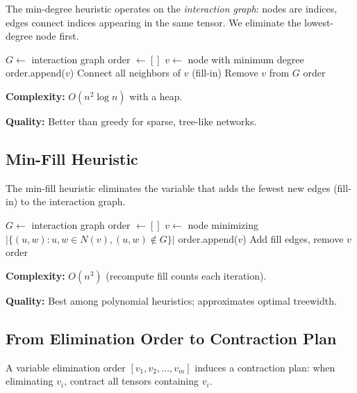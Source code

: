 \documentclass[11pt,a4paper]{article}
\begin{document}
The min-degree heuristic operates on the \emph{interaction graph}: nodes are indices,
edges connect indices appearing in the same tensor. We eliminate the lowest-degree node first.

\begin{algorithm}[ht]
\caption{Min-Degree Variable Elimination}
\label{alg:min_degree_chirho}
\begin{algorithmic}[1]
\State $G \gets$ interaction graph
\State order $\gets []$
  \State $v \gets$ node with minimum degree
  \State order.append($v$)
  \State Connect all neighbors of $v$ (fill-in)
  \State Remove $v$ from $G$
\EndWhile
\State \Return order
\end{algorithmic}
\end{algorithm}

\textbf{Complexity:} $O(n^2 \log n)$ with a heap.

\textbf{Quality:} Better than greedy for sparse, tree-like networks.

\subsection{Min-Fill Heuristic}

The min-fill heuristic eliminates the variable that adds the fewest new edges (fill-in)
to the interaction graph.

\begin{algorithm}[ht]
\caption{Min-Fill Variable Elimination}
\label{alg:min_fill_chirho}
\begin{algorithmic}[1]
\State $G \gets$ interaction graph
\State order $\gets []$
  \State $v \gets$ node minimizing $|\{(u,w) : u,w \in N(v), (u,w) \notin G\}|$
  \State order.append($v$)
  \State Add fill edges, remove $v$
\EndWhile
\State \Return order
\end{algorithmic}
\end{algorithm}

\textbf{Complexity:} $O(n^3)$ (recompute fill counts each iteration).

\textbf{Quality:} Best among polynomial heuristics; approximates optimal treewidth.

\subsection{From Elimination Order to Contraction Plan}

A variable elimination order $[v_1, v_2, \ldots, v_m]$ induces a contraction plan:
when eliminating $v_i$, contract all tensors containing $v_i$.
\end{document}
